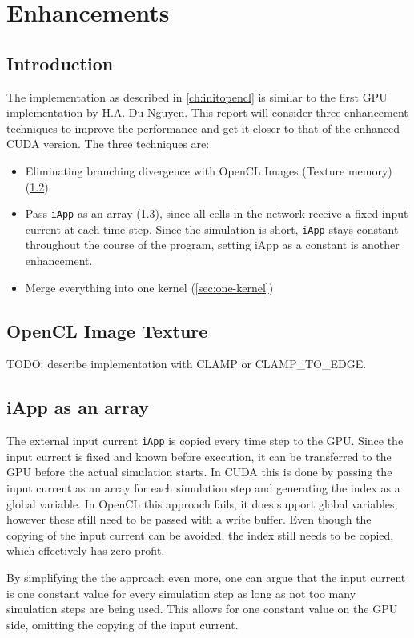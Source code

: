 \documentclass[final]{report}
\begin{document}
\chapter{Enhancements}

\section{Introduction}
The implementation as described in \cref{ch:initopencl} is similar to the first GPU implementation by H.A. Du Nguyen.
This report will consider three enhancement techniques to improve the performance and get it closer to that of the enhanced CUDA version.
The three techniques are:
\begin{itemize}
	\item Eliminating branching divergence with OpenCL Images (Texture memory) (\cref{sec:image-texture}).
	\item Pass \texttt{iApp} as an array (\cref{sec:iapp-array}), since all cells in the network receive a fixed input current at each time step. Since the simulation is short, \texttt{iApp} stays constant throughout the course of the program, setting iApp as a constant is another enhancement.
	\item Merge everything into one kernel (\cref{sec:one-kernel})
\end{itemize}

\section{OpenCL Image Texture}\label{sec:image-texture}
TODO: describe implementation
with CLAMP or CLAMP\_TO\_EDGE.

\section{iApp as an array}\label{sec:iapp-array}
The external input current \texttt{iApp} is copied every time step to the GPU.
Since the input current is fixed and known before execution, it can be transferred to the GPU before the actual simulation starts.
In CUDA this is done by passing the input current as an array for each simulation step and generating the index as a global variable.
In OpenCL this approach fails, it does support global variables, however these still need to be passed with a write buffer.
Even though the copying of the input current can be avoided, the index still needs to be copied, which effectively has zero profit.

By simplifying the the approach even more, one can argue that the input current is one constant value for every simulation step as long as not too many simulation steps are being used.
This allows for one constant value on the GPU side, omitting the copying of the input current.
\end{document}
